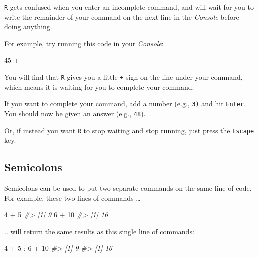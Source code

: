 \documentclass[
]{book}
\newenvironment{Shaded}{\begin{snugshade}}{\end{snugshade}}
\newcommand{\CommentTok}[1]{\textcolor[rgb]{0.56,0.35,0.01}{\textit{#1}}}
\newcommand{\DecValTok}[1]{\textcolor[rgb]{0.00,0.00,0.81}{#1}}
\newcommand{\NormalTok}[1]{#1}
\newcommand{\SpecialCharTok}[1]{\textcolor[rgb]{0.00,0.00,0.00}{#1}}
\begin{document}
\texttt{R} gets confused when you enter an incomplete command, and will wait for you to write the remainder of your command on the next line in the \emph{Console} before doing anything.

For example, try running this code in your \emph{Console}:

\begin{Shaded}
\begin{Highlighting}[]
\DecValTok{45} \SpecialCharTok{+}
\end{Highlighting}
\end{Shaded}

You will find that \texttt{R} gives you a little \texttt{+} sign on the line under your command, which means it is waiting for you to complete your command.

If you want to complete your command, add a number (e.g., \texttt{3)} and hit \texttt{Enter}. You should now be given an answer (e.g., \texttt{48}).

Or, if instead you want \texttt{R} to stop waiting and stop running, just press the \texttt{Escape} key.

\hypertarget{semicolons}{%
\subsection*{Semicolons}\label{semicolons}}

Semicolons can be used to put two separate commands on the same line of code. For example, these two lines of commands \ldots{}

\begin{Shaded}
\begin{Highlighting}[]
\DecValTok{4} \SpecialCharTok{+} \DecValTok{5}
\CommentTok{\#\textgreater{} [1] 9}
\DecValTok{6} \SpecialCharTok{+} \DecValTok{10}
\CommentTok{\#\textgreater{} [1] 16}
\end{Highlighting}
\end{Shaded}

.. will return the same results as this single line of commands:

\begin{Shaded}
\begin{Highlighting}[]
\DecValTok{4} \SpecialCharTok{+} \DecValTok{5}\NormalTok{ ; }\DecValTok{6} \SpecialCharTok{+} \DecValTok{10}
\CommentTok{\#\textgreater{} [1] 9}
\CommentTok{\#\textgreater{} [1] 16}
\end{Highlighting}
\end{Shaded}
\end{document}
